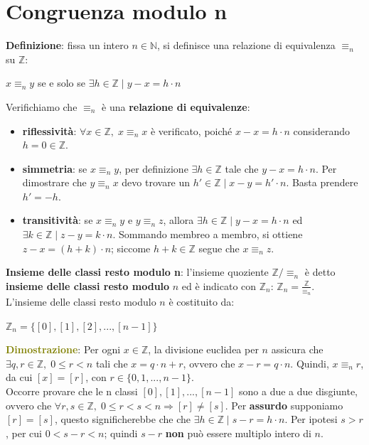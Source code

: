 \section{Congruenza modulo n}
\textbf{Definizione}: fissa un intero $n \in \mathbb{N}$, si definisce una relazione di equivalenza $\equiv_n$ su $\mathbb{Z}$:
\begin{center}
    $x \equiv_n y$ se e solo se $\exists h \in \mathbb{Z} \; | \; y - x = h \cdot n$
\end{center}
Verifichiamo che $\equiv_n$ è una \textbf{relazione di equivalenze}:
\begin{itemize}[nosep]
    \item \textbf{riflessività}: $\forall x \in \mathbb{Z}, \; x \equiv_n x$ è verificato, poiché $x - x = h \cdot n$ considerando $h = 0 \in \mathbb{Z}$.
    \item \textbf{simmetria}: se $x \equiv_n y$, per definizione $\exists h \in \mathbb{Z}$ tale che $y - x = h \cdot n$. Per dimostrare che $y \equiv_n x$ devo trovare un $h' \in \mathbb{Z} \; | \; x-y = h' \cdot n$. Basta prendere $h'=-h$.
    \item \textbf{transitività}: se $x \equiv_n y$ e $y \equiv_n z$, allora $\exists h \in \mathbb{Z} \; | \; y - x = h \cdot n$ ed $\exists k \in \mathbb{Z} \; | \; z - y = k \cdot n$. Sommando membreo a membro, si ottiene $z - x = (h + k) \cdot n$; siccome $h + k \in \mathbb{Z}$ segue che $x \equiv_n z$.
\end{itemize}
\textbf{Insieme delle classi resto modulo n}: l'insieme quoziente $\mathbb{Z}/ \equiv_n$ è detto \textbf{insieme delle classi resto modulo} $n$ ed è indicato con $\mathbb{Z}_n$: $\mathbb{Z}_n = \frac{\mathbb{Z}}{\equiv_n}$. \\
L'insieme delle classi resto modulo $n$ è costituito da: 
\begin{center}
    $\mathbb{Z}_n = \{[0], [1], [2], ..., [n-1]\}$
\end{center}
\textcolor{olive}{\textbf{Dimostrazione}}: Per ogni $x \in \mathbb{Z}$, la divisione euclidea per $n$ assicura che $\exists q,r \in \mathbb{Z}, \; 0 \leq r < n$ tali che $x = q \cdot n + r$, ovvero che $x - r = q \cdot n$. Quindi, $x \equiv_n r$, da cui $[x] = [r]$, con $r \in \{0,1,..., n-1\}$. \\
Occorre provare che le n classi $[0], [1], ..., [n-1]$ sono a due a due disgiunte, ovvero che $\forall r,s \in \mathbb{Z}, \; 0 \leq r < s < n \Rightarrow [r] \neq [s]$. Per \textbf{assurdo} supponiamo $[r] = [s]$, questo significherebbe che che $\exists h \in \mathbb{Z} \; | \; s - r = h \cdot n$. Per ipotesi $s > r$, per cui $0 < s - r < n$; quindi $s - r$ \textbf{non} può essere multiplo intero di $n$.

